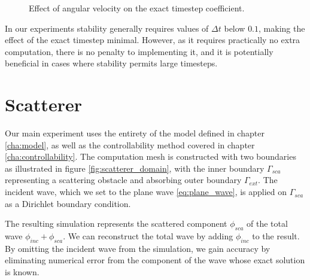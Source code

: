 \documentclass[utf8,english]{gradu3}
\begin{document}
\begin{figure}[h]
  \centering
  \caption{Effect of angular velocity on the exact timestep coefficient.}
  \label{fig:exact_coef_comparison}
\end{figure}

In our experiments stability generally requires values of $\Delta t$ below $0.1$,
making the effect of the exact timestep minimal.
However, as it requires practically no extra computation,
there is no penalty to implementing it,
and it is potentially beneficial in cases
where stability permits large timesteps.


\section{Scatterer}

Our main experiment uses the entirety of the model defined in chapter \ref{cha:model},
as well as the controllability method covered in chapter \ref{cha:controllability}.
The computation mesh is constructed with two boundaries
as illustrated in figure \ref{fig:scatterer_domain},
with the inner boundary $\Gamma_{sca}$ representing a scattering obstacle
and absorbing outer boundary $\Gamma_{ext}$.
The incident wave, which we set to the plane wave \eqref{eq:plane_wave},
is applied on $\Gamma_{sca}$ as a Dirichlet boundary condition.

The resulting simulation represents the scattered component $\phi_{sca}$
of the total wave $\phi_{inc} + \phi_{sca}$.
We can reconstruct the total wave by adding $\phi_{inc}$ to the result.
By omitting the incident wave from the simulation,
we gain accuracy by eliminating numerical error from the component of the wave
whose exact solution is known.
\end{document}
